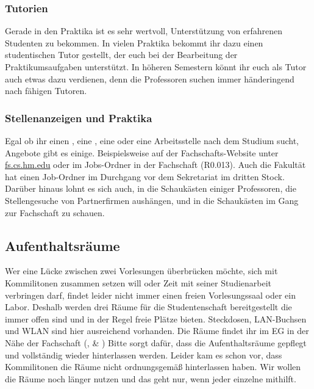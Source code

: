 \subsubsection{Tutorien}
Gerade in den Praktika ist es sehr wertvoll, Unterstützung von 
erfahrenen Studenten zu bekommen. In vielen Praktika bekommt ihr 
dazu einen studentischen Tutor gestellt, der euch bei der Bearbeitung 
der Praktikumsaufgaben unterstützt. \doublebreak
In höheren Semestern könnt ihr euch als Tutor auch etwas dazu 
verdienen, denn die Professoren suchen immer händeringend nach 
fähigen Tutoren. 

\subsubsection{Stellenanzeigen und Praktika}
Egal ob ihr einen , eine , 
eine  oder eine Arbeitsstelle nach dem 
Studium sucht, Angebote gibt es einige. Beispielsweise auf der 
Fachschafts-Website unter \url{fs.cs.hm.edu} \arrow {} \arrow {} oder im
Jobs-Ordner in der Fachschaft (R0.013). Auch die Fakultät hat einen Job-Ordner im Durchgang vor dem Sekretariat im dritten Stock. Darüber 
hinaus lohnt es sich auch, in die Schaukästen einiger Professoren, die Stellengesuche von Partnerfirmen aushängen, und in die Schaukästen im Gang zur Fachschaft zu schauen.

\subsection{Aufenthaltsräume}
Wer eine Lücke zwischen zwei Vorlesungen überbrücken möchte, sich mit Kommilitonen
zusammen setzen will oder Zeit mit seiner Studienarbeit verbringen darf, findet leider nicht
immer einen freien Vorlesungssaal oder ein Labor. 
Deshalb werden drei Räume für die Studentenschaft bereitgestellt die 
immer offen sind und in der Regel freie Plätze bieten. Steckdosen, LAN-Buchsen und WLAN sind hier ausreichend vorhanden. Die Räume findet 
ihr im EG in der Nähe der Fachschaft (,  \& )
Bitte sorgt dafür, dass die Aufenthaltsräume gepflegt und vollständig wieder hinterlassen werden.
Leider kam es schon vor, dass Kommilitonen die Räume nicht ordnungsgemäß hinterlassen haben.
Wir wollen die Räume noch länger nutzen und das geht nur, wenn jeder einzelne mithilft.